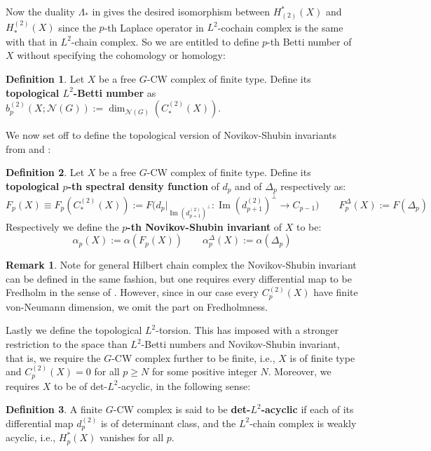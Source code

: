 \documentclass[11pt]{report}
\theoremstyle{definition}
\newtheorem{Def}{Definition}[chapter]
\newtheorem{Rmk}{Remark}[chapter]
\theoremstyle{plain}
\DeclareMathOperator{\im}{Im}
\newcommand{\vna}{\mathcal{N}}
\begin{document}
Now the duality $\Lambda_*$ in  gives the desired isomorphism between $H^*_{(2)}(X)$ and $H_*^{(2)}(X)$ since the $p$-th Laplace operator in $L^2$-cochain complex is the same with that in $L^2$-chain complex. So we are entitled to define $p$-th Betti number of $X$ without specifying the cohomology or homology:
\begin{Def}\label{1.30}
	Let $X$ be a free $G$-CW complex of finite type. Define its \textbf{topological $L^2$-Betti number} as $b_p^{(2)}(X;\vna(G)):=\dim_{\vna(G)}(C^{(2)}_*(X))$.
\end{Def}
We now set off to define the topological version of Novikov-Shubin invariants from  and :
\begin{Def}\label{2.54}
	Let $X$ be a free $G$-CW complex of finite type. Define its \textbf{topological $p$-th spectral density function} of $d_p$ and of $\Delta_p$ respectively as:
	\begin{equation}
	F_p(X)\equiv F_p(C^{(2)}_*(X)):=F\Big(d_p|_{\im(d^{(2)}_{p+1})^\perp}:\im(d^{(2)}_{p+1})^\perp \to C_{p-1}\Big)  \qquad  F^\Delta_p(X):=F(\Delta_p)
	\end{equation}
	Respectively we define the \textbf{$p$-th Novikov-Shubin invariant} of $X$ to be:
	\begin{equation}
	\alpha_p(X):=\alpha(F_p(X)) \qquad \alpha_p^\Delta(X):=\alpha(\Delta_p)
	\end{equation}
\end{Def}
\begin{Rmk}
	Note for general Hilbert chain complex the Novikov-Shubin invariant can be defined in the same fashion, but one requires every differential map to be Fredholm in the sense of . However, since in our case every $C_p^{(2)}(X)$ have finite von-Neumann dimension, we omit the part on Fredholmness.
\end{Rmk}
Lastly we define the topological $L^2$-torsion. This has imposed with a stronger restriction to the space than $L^2$-Betti numbers and Novikov-Shubin invariant, that is, we require the $G$-CW complex further to be finite, i.e., $X$ is of finite type and $C^{(2)}_p(X)=0$ for all $p\geq N$ for some positive integer $N$. Moreover, we requires $X$ to be of det-$L^2$-acyclic, in the following sense:
\begin{Def}
	A finite $G$-CW complex is said to be \textbf{det-$L^2$-acyclic} if each of its differential map $d_p^{(2)}$ is of determinant class, and the $L^2$-chain complex is weakly acyclic, i.e., $H_p^*(X)$ vanishes for all $p$.
\end{Def}
\end{document}
